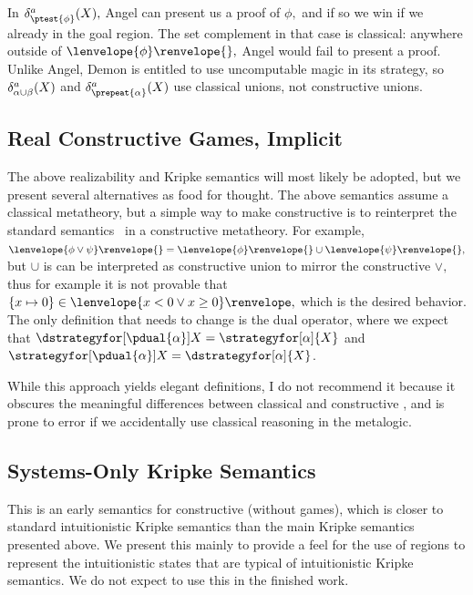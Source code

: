 \documentclass[12pt]{cmuthesis}
\theoremstyle{definition}
\theoremstyle{remark}
\newcommand{\fint}[1]{\lenvelope{#1}\renvelope}
\begin{document}


In $\dstrategyforR[\ptest{\phi}]{\aa}{X},$ Angel can present us a proof of $\phi,$ and if so we win if we already in the goal region.
The set complement in that case is classical: anywhere outside of $\fint{\phi}{},$ Angel would fail to present a proof.
Unlike Angel, Demon is entitled to use uncomputable magic in its strategy, so $\dstrategyforR[\alpha\cup\beta]{\aa}{X}$ and $\dstrategyforR[\prepeat{\alpha}]{\aa}{X}$ use classical unions, not constructive unions.


\subsection{Real Constructive Games, Implicit}
The above realizability and Kripke semantics will most likely be adopted, but we present several alternatives as food for thought.
The above semantics assume a classical metatheory, but a simple way to make \dGL constructive is to reinterpret the standard \dGL semantics~\cite{DBLP:journals/tocl/Platzer17} in a constructive metatheory.
For example, $\fint{\phi \lor \psi}{} = \fint{\phi}{} \cup \fint{\psi}{},$ but $\cup$ is can be interpreted as constructive union to mirror the constructive $\lor,$ thus for example it is not provable that $\{x \mapsto 0\} \in \fint{x < 0 \lor x \geq 0},$ which is the desired behavior.
The only definition that needs to change is the dual operator, where we expect that $\dstrategyfor[\pdual{\alpha}]{X} = \strategyfor[\alpha]{X}$ and $\strategyfor[\pdual{\alpha}]{X} = \dstrategyfor[\alpha]{X}$.

While this approach yields elegant definitions, I do not recommend it because it obscures the meaningful differences between classical and constructive \dGL, and is prone to error if we accidentally use classical reasoning in the metalogic.

\subsection{Systems-Only Kripke Semantics}
This is an early semantics for constructive \dL (without games), which is closer to standard intuitionistic Kripke semantics than the main Kripke semantics presented above.
We present this mainly to provide a feel for the use of regions to represent the intuitionistic states that are typical of intuitionistic Kripke semantics.
We do not expect to use this in the finished work.
\end{document}
